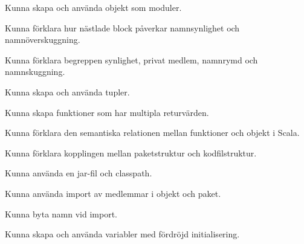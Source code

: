 
\item Kunna skapa och använda objekt som moduler.
\item Kunna förklara hur nästlade block påverkar namnsynlighet och namnöverskuggning.
\item Kunna förklara begreppen synlighet, privat medlem, namnrymd och namnskuggning.

\item Kunna skapa och använda tupler.
\item Kunna skapa funktioner som har multipla returvärden.
\item Kunna förklara den semantiska relationen mellan funktioner och objekt i Scala.

\item Kunna förklara kopplingen mellan paketstruktur och kodfilstruktur.
\item Kunna använda en jar-fil och classpath.

\item Kunna använda import av medlemmar i objekt och paket.
\item Kunna byta namn vid import.

\item Kunna skapa och använda variabler med fördröjd initialisering.
